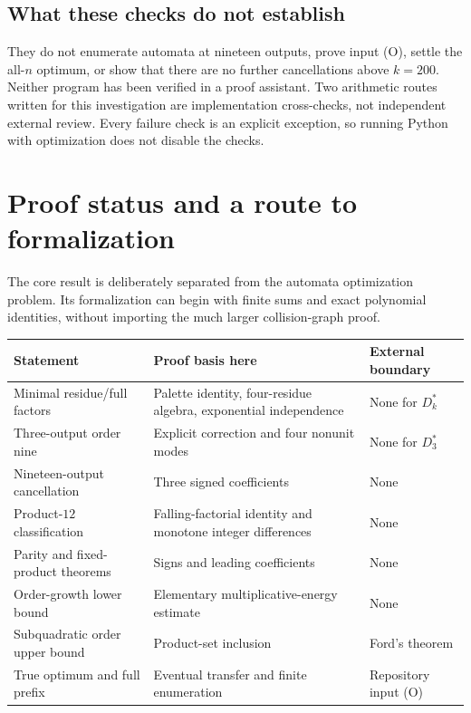 \documentclass[11pt,a4paper]{article}
\numberwithin{equation}{section}
\theoremstyle{definition}
\theoremstyle{remark}
\begin{document}
\subsection{What these checks do not establish}
They do not enumerate automata at nineteen outputs, prove
input (O), settle the all-$n$ optimum, or show that there are no further
cancellations above $k=200$. Neither program has been verified in a proof
assistant. Two arithmetic routes written for this investigation are
implementation cross-checks, not independent external review. Every
failure check is an explicit exception, so running Python with optimization
does not disable the checks.

\section{Proof status and a route to formalization}\label{sc:sec:formal}

The core result is deliberately separated from the automata optimization
problem. Its formalization can begin with finite sums and exact polynomial
identities, without importing the much larger collision-graph proof.

\begin{center}
\small
\begin{tabular}{@{}>{\raggedright\arraybackslash}p{}>{\raggedright\arraybackslash}p{}>{\raggedright\arraybackslash}p{}@{}}
\toprule
Statement & Proof basis here & External boundary\\\midrule
Minimal residue/full factors & Palette identity, four-residue algebra,
exponential independence & None for $D^*_k$\\
Three-output order nine & Explicit correction and four nonunit modes &
None for $D_3^*$\\
Nineteen-output cancellation & Three signed coefficients & None\\
Product-$12$ classification & Falling-factorial identity and monotone
integer differences & None\\
Parity and fixed-product theorems & Signs and leading coefficients & None\\
Order-growth lower bound & Elementary multiplicative-energy estimate & None\\
Subquadratic order upper bound & Product-set inclusion & Ford's theorem\\
True optimum and full prefix & Eventual transfer and finite enumeration &
Repository input (O)\\\bottomrule
\end{tabular}
\end{center}
\end{document}
